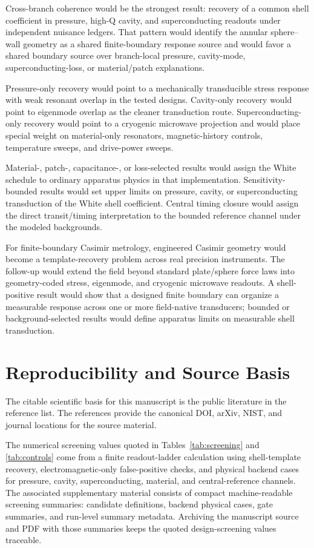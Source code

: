\documentclass[11pt]{article}
\begin{document}
Cross-branch coherence would be the strongest result: recovery of a common
shell coefficient in pressure, high-Q cavity, and superconducting readouts
under independent nuisance ledgers. That pattern would identify the annular
sphere--wall geometry as a shared finite-boundary response source and would
favor a shared boundary source over branch-local pressure, cavity-mode,
superconducting-loss, or material/patch explanations.

Pressure-only recovery would point to a mechanically transducible stress
response with weak resonant overlap in the tested designs. Cavity-only
recovery would point to eigenmode overlap as the cleaner transduction route.
Superconducting-only recovery would point to a cryogenic microwave projection
and would place special weight on material-only resonators, magnetic-history
controls, temperature sweeps, and drive-power sweeps.

Material-, patch-, capacitance-, or loss-selected results would assign the
White schedule to ordinary apparatus physics in that implementation.
Sensitivity-bounded results would set upper limits on pressure, cavity, or
superconducting transduction of the White shell coefficient. Central timing
closure would assign the direct transit/timing interpretation to the bounded
reference channel under the modeled backgrounds.

For finite-boundary Casimir metrology, engineered Casimir geometry would
become a template-recovery problem across real precision instruments. The
follow-up would extend the field beyond standard plate/sphere force laws into
geometry-coded stress, eigenmode, and cryogenic microwave readouts. A
shell-positive result would show that a designed finite boundary can organize
a measurable response across one or more field-native transducers; bounded or
background-selected results would define apparatus limits on measurable shell
transduction.

\section{Reproducibility and Source Basis}

The citable scientific basis for this manuscript is the public literature in
the reference list. The references provide the canonical DOI, arXiv, NIST, and
journal locations for the source material.

The numerical screening values quoted in Tables~\ref{tab:screening} and
\ref{tab:controls} come from a finite readout-ladder calculation using
shell-template recovery, electromagnetic-only false-positive checks, and
physical backend cases for pressure, cavity, superconducting, material, and
central-reference channels. The associated supplementary material consists of
compact machine-readable screening summaries: candidate definitions, backend
physical cases, gate summaries, and run-level summary metadata. Archiving the
manuscript source and PDF with those summaries keeps the quoted
design-screening values traceable.
\end{document}
